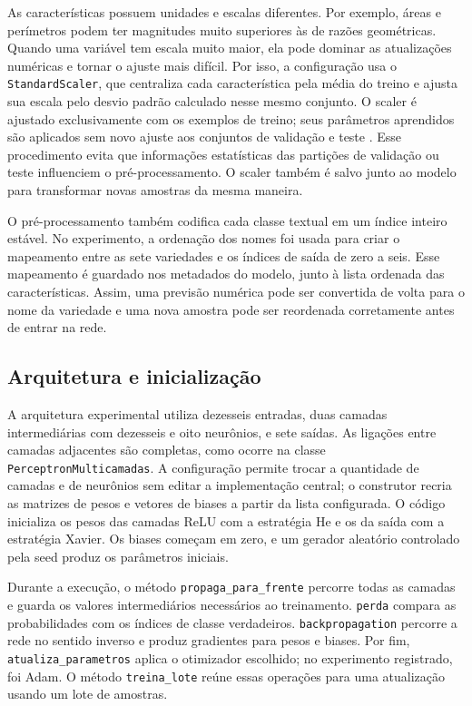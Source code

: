 \documentclass[12pt]{article}
\begin{document}
As características possuem unidades e escalas diferentes. Por exemplo, áreas e perímetros podem ter magnitudes muito superiores às de razões geométricas. Quando uma variável tem escala muito maior, ela pode dominar as atualizações numéricas e tornar o ajuste mais difícil. Por isso, a configuração usa o \texttt{StandardScaler}, que centraliza cada característica pela média do treino e ajusta sua escala pelo desvio padrão calculado nesse mesmo conjunto. O scaler é ajustado exclusivamente com os exemplos de treino; seus parâmetros aprendidos são aplicados sem novo ajuste aos conjuntos de validação e teste \cite{pedregosa2011}. Esse procedimento evita que informações estatísticas das partições de validação ou teste influenciem o pré-processamento. O scaler também é salvo junto ao modelo para transformar novas amostras da mesma maneira.

O pré-processamento também codifica cada classe textual em um índice inteiro estável. No experimento, a ordenação dos nomes foi usada para criar o mapeamento entre as sete variedades e os índices de saída de zero a seis. Esse mapeamento é guardado nos metadados do modelo, junto à lista ordenada das características. Assim, uma previsão numérica pode ser convertida de volta para o nome da variedade e uma nova amostra pode ser reordenada corretamente antes de entrar na rede.

\subsection{Arquitetura e inicialização}

A arquitetura experimental utiliza dezesseis entradas, duas camadas intermediárias com dezesseis e oito neurônios, e sete saídas. As ligações entre camadas adjacentes são completas, como ocorre na classe \texttt{PerceptronMulticamadas}. A configuração permite trocar a quantidade de camadas e de neurônios sem editar a implementação central; o construtor recria as matrizes de pesos e vetores de biases a partir da lista configurada. O código inicializa os pesos das camadas ReLU com a estratégia He e os da saída com a estratégia Xavier. Os biases começam em zero, e um gerador aleatório controlado pela seed produz os parâmetros iniciais.

Durante a execução, o método \texttt{propaga\_para\_frente} percorre todas as camadas e guarda os valores intermediários necessários ao treinamento. \texttt{perda} compara as probabilidades com os índices de classe verdadeiros. \texttt{backpropagation} percorre a rede no sentido inverso e produz gradientes para pesos e biases. Por fim, \texttt{atualiza\_parametros} aplica o otimizador escolhido; no experimento registrado, foi Adam. O método \texttt{treina\_lote} reúne essas operações para uma atualização usando um lote de amostras.
\end{document}
